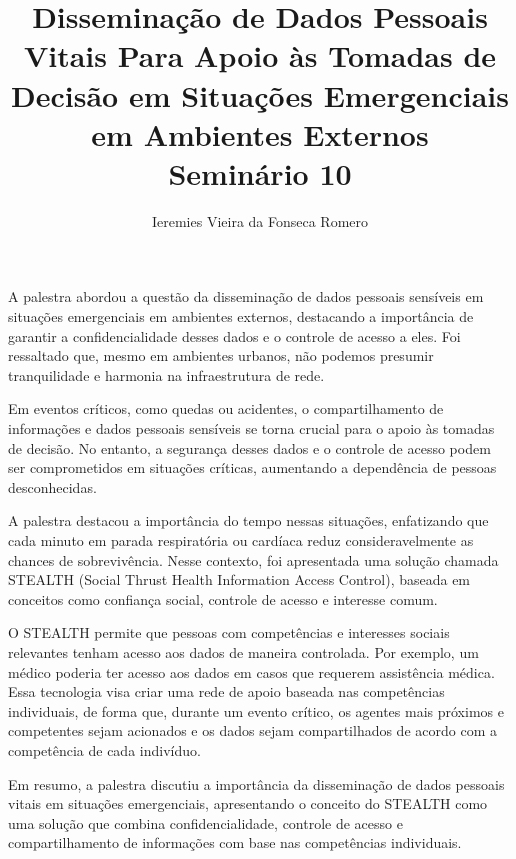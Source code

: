 \documentclass[11pt]{article}
\author{Ieremies Vieira da Fonseca Romero}
\date{}
\title{Disseminação de Dados Pessoais Vitais Para Apoio às Tomadas de Decisão em Situações Emergenciais em Ambientes Externos\\\medskip
\large Seminário 10}
\begin{document}
\maketitle
A palestra abordou a questão da disseminação de dados pessoais sensíveis em situações emergenciais em ambientes externos, destacando a importância de garantir a confidencialidade desses dados e o controle de acesso a eles. Foi ressaltado que, mesmo em ambientes urbanos, não podemos presumir tranquilidade e harmonia na infraestrutura de rede.

Em eventos críticos, como quedas ou acidentes, o compartilhamento de informações e dados pessoais sensíveis se torna crucial para o apoio às tomadas de decisão. No entanto, a segurança desses dados e o controle de acesso podem ser comprometidos em situações críticas, aumentando a dependência de pessoas desconhecidas.

A palestra destacou a importância do tempo nessas situações, enfatizando que cada minuto em parada respiratória ou cardíaca reduz consideravelmente as chances de sobrevivência. Nesse contexto, foi apresentada uma solução chamada STEALTH (Social Thrust Health Information Access Control), baseada em conceitos como confiança social, controle de acesso e interesse comum.

O STEALTH permite que pessoas com competências e interesses sociais relevantes tenham acesso aos dados de maneira controlada. Por exemplo, um médico poderia ter acesso aos dados em casos que requerem assistência médica. Essa tecnologia visa criar uma rede de apoio baseada nas competências individuais, de forma que, durante um evento crítico, os agentes mais próximos e competentes sejam acionados e os dados sejam compartilhados de acordo com a competência de cada indivíduo.

Em resumo, a palestra discutiu a importância da disseminação de dados pessoais vitais em situações emergenciais, apresentando o conceito do STEALTH como uma solução que combina confidencialidade, controle de acesso e compartilhamento de informações com base nas competências individuais.
\end{document}
